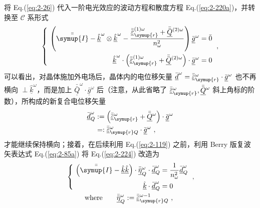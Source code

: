 将 Eq.(\ref{eq:2-26}) 代入一阶电光效应的波动方程和散度方程 Eq.(\ref{eq:2-220a})，并转换至 $\mathcal C$ 系形式
\begin{equation} \label{eq:2-224}
	\left\{\ \begin{aligned} \left( \bar{\bar{\symup{I}}} - \hat{\underline{k}}^\omega \otimes \hat{\underline{k}}^\omega - \frac{ \bar{\bar{\underline{\varepsilon}}}_{\symup{r}}^{(1)\omega} + {\bar{\bar{\underline{Q}}}^{(2)\omega}} }{ n^2_\omega } \right) \bar{\underline{g}}^{\omega} &= \bar{0} \\ \hat{\underline{k}}^\omega \cdot \left( \bar{\bar{\underline{\varepsilon}}}_{\symup{r}}^{(1)\omega} + {\bar{\bar{\underline{Q}}}^{(2)\omega}} \right) \cdot \bar{\underline{g}}^{\omega} &= 0 \end{aligned}\right. ~,
\end{equation}
可以看出，对晶体施加外电场后，晶体内的电位移矢量 $\bar{\underline{d}}^{\omega} = \bar{\bar{\underline{\varepsilon}}}_{\symup{r}}^{\omega} \cdot \bar{\underline{g}}^{\omega}$ 也不再横向 $\perp \hat{\underline{k}}^\omega$，而是加上 ${\bar{\bar{\underline{Q}}}^{\omega}} \cdot \bar{\underline{g}}^{\omega}$ 后（注意，从此省略了 $\bar{\bar{\underline{\varepsilon}}}_{\symup{r}}^{\omega}, {\bar{\bar{\underline{Q}}}^{\omega}}$ 斜上角标的阶数），所构成的新复合电位移矢量
\begin{subequations} \label{eq:2-225}
	\abovedisplayskip=13pt
	\belowdisplayskip=13pt
	\begin{align}
		\bar{\underline{d}}^{\omega}_Q &:= \left( \bar{\bar{\underline{\varepsilon}}}_{\symup{r}}^{\omega} + {\bar{\bar{\underline{Q}}}^{\omega}} \right) \cdot \bar{\underline{g}}^{\omega} \label{eq:2-225a} \\ &=: \bar{\bar{\underline{\varepsilon}}}_{\symup{r}Q}^{\omega} \cdot \bar{\underline{g}}^{\omega} \label{eq:2-225b}~,
	\end{align}
\end{subequations}
才能继续保持横向；接着，在后续利用 Eq.(\ref{eq:2-119}) 之前，利用 Berry 版复波矢表达式 Eq.(\ref{eq:2-85a}) 将 Eq.(\ref{eq:2-224}) 改造为
\begin{subequations} \label{eq:2-226}
	\abovedisplayskip=13pt
	\belowdisplayskip=13pt
	\begin{align}
		&\left\{\ \begin{aligned} \left( \bar{\bar{\symup{I}}} - \hat{\underline{k}} \hat{\underline{k}} \right) \cdot \bar{\bar{\underline{\eta}}}^{\omega}_Q \cdot \bar{\underline{d}}^{\omega}_Q &= \frac{ 1 }{ n^2_\omega } \bar{\underline{d}}^{\omega}_Q \\ \hat{\underline{k}} \cdot \bar{\underline{d}}^{\omega}_Q &= 0 \end{aligned}\right. \label{eq:2-226a}~, \\ &\ \ \ \ \ \ \ \ \text{where}\ \ \ \ \ \ \bar{\bar{\underline{\eta}}}^{\omega}_Q := \bar{\bar{\underline{\varepsilon}}}_{\symup{r}Q}^{\omega-1} \label{eq:2-226b}~,
	\end{align}
\end{subequations}

